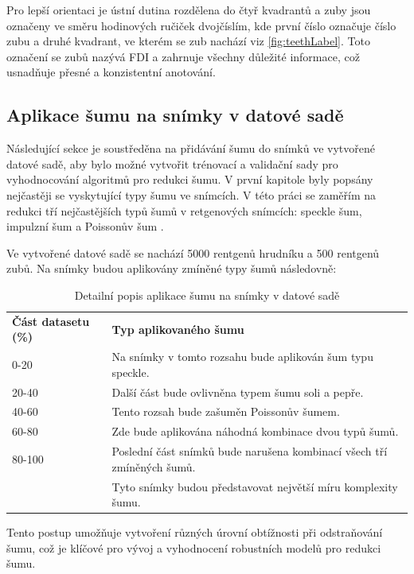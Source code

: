 \documentclass[male,czech,api_ing]{thesis}
\begin{document}
Pro lepší orientaci je ústní dutina rozdělena do čtyř kvadrantů a zuby jsou označeny ve směru hodinových ručiček dvojčíslím, kde první číslo označuje číslo zubu a druhé kvadrant, ve kterém se zub nachází viz \ref{fig:teethLabel}. Toto označení se zubů nazývá FDI a zahrnuje všechny důležité informace, což usnadňuje přesné a konzistentní anotování.

\subsection{Aplikace šumu na snímky v datové sadě}
Následující sekce je soustředěna na přidávání šumu do snímků ve vytvořené datové sadě, aby bylo možné vytvořit trénovací a validační sady pro vyhodnocování algoritmů pro redukci šumu. V první kapitole byly popsány nejčastěji se vyskytující typy šumu ve snímcích. V této práci se zaměřím na redukci tří nejčastějších typů šumů v retgenových snímcích: speckle šum, impulzní šum a Poissonův šum \cite{MostCommonNoises}.

Ve vytvořené datové sadě se nachází 5000 rentgenů hrudníku a 500 rentgenů zubů. Na snímky budou aplikovány zmíněné typy šumů následovně:

\begin{table}[H]
    \caption{Detailní popis aplikace šumu na snímky v datové sadě}
    \label{table:noiseTypes}
    \begin{tabular}{@{}ll@{}}
        \textbf{Část datasetu (\%)} & \textbf{Typ aplikovaného šumu} \\
        0-20   & Na snímky v tomto rozsahu bude aplikován šum typu speckle. \\
        20-40  & Další část bude ovlivněna typem šumu soli a pepře. \\
        40-60  & Tento rozsah bude zašuměn Poissonův šumem. \\
        60-80  & Zde bude aplikována náhodná kombinace dvou typů šumů. \\
        80-100 & Poslední část snímků bude narušena kombinací všech tří zmíněných šumů. \\ 
               & Tyto snímky budou představovat největší míru komplexity šumu. \\
    \end{tabular}
\end{table}

Tento postup umožňuje vytvoření různých úrovní obtížnosti při odstraňování šumu, což je klíčové pro vývoj a vyhodnocení robustních modelů pro redukci šumu.
\end{document}
